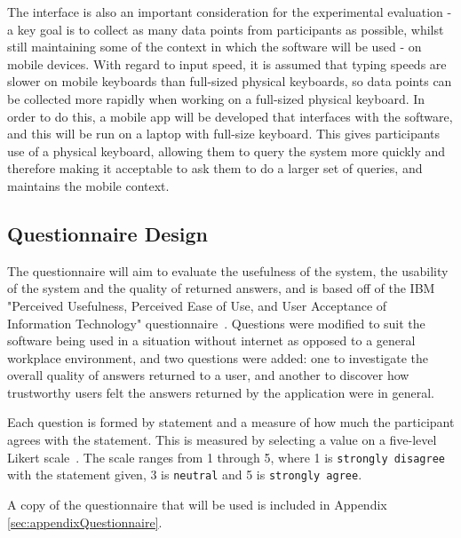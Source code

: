 \documentclass[authoryearcitations]{UoYCSproject}
\begin{document}
{\color{red} The interface is also an important consideration for the experimental evaluation - a key goal is to collect as many data points from participants as possible, whilst still maintaining some of the context in which the software will be used - on mobile devices. With regard to input speed, it is assumed that typing speeds are slower on mobile keyboards than full-sized physical keyboards, so data points can be collected more rapidly when working on a full-sized physical keyboard. In order to do this, a mobile app will be developed that interfaces with the software, and this will be run on a laptop with full-size keyboard. This gives participants use of a physical keyboard, allowing them to query the system more quickly and therefore making it acceptable to ask them to do a larger set of queries, and maintains the mobile context.}

\subsection{Questionnaire Design}
\label{subsec:questionnaire}
The questionnaire will aim to evaluate the usefulness of the system, the usability of the system and the quality of returned answers, and is based off of the IBM "Perceived Usefulness, Perceived Ease of Use, and User Acceptance of Information Technology" questionnaire~\cite{davis1989perceived}.  Questions were modified to suit the software being used in a situation without internet as opposed to a general workplace environment, and two questions were added: one to investigate the overall quality of answers returned to a user, and another to discover how trustworthy users felt the answers returned by the application were in general. 

Each question is formed by statement and a measure of how much the participant agrees with the statement. This is measured by selecting a value on a five-level Likert scale~\cite{likertScale}. The scale ranges from 1 through 5, where 1 is \texttt{strongly disagree} with the statement given, 3 is \texttt{neutral} and 5 is \texttt{strongly agree}.

A copy of the questionnaire that will be used is included in Appendix \ref{sec:appendixQuestionnaire}.
\end{document}
